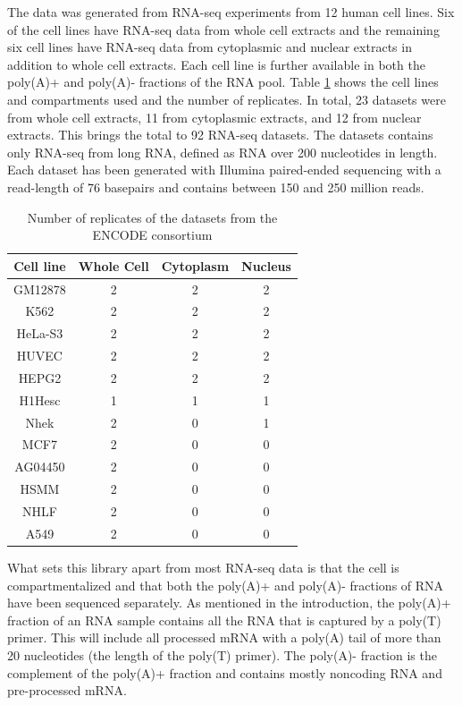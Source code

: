 The data was generated from RNA-seq experiments from 12 human cell lines. Six
of the cell lines have RNA-seq data from whole cell extracts and the remaining
six cell lines have RNA-seq data from cytoplasmic and nuclear extracts in
addition to whole cell extracts. Each cell line is further available in both
the poly(A)+ and poly(A)- fractions of the RNA pool. Table \ref{tab:Datasets}
shows the cell lines and compartments used and the number of replicates. In
total, 23 datasets were from whole cell extracts, 11 from cytoplasmic extracts,
and 12 from nuclear extracts. This brings the total to 92 RNA-seq datasets. The
datasets contains only RNA-seq from long RNA, defined as RNA over 200
nucleotides in length. Each dataset has been generated with Illumina
paired-ended sequencing with a read-length of 76 basepairs and contains between
150 and 250 million reads.

\begin{table}[hb]
	\centering
	\begin{tabular}{cccc}
	  Cell line & Whole Cell & Cytoplasm & Nucleus \\
	  \midrule
	  GM12878 & 2 & 2 & 2 \\
	  K562 & 2 & 2 & 2 \\
	  HeLa-S3 & 2 & 2 & 2 \\
	  HUVEC & 2 & 2 & 2 \\
	  HEPG2 & 2 & 2 & 2 \\
	  H1Hesc & 1 & 1 & 1 \\
	  Nhek & 2 & 0 & 1 \\
	  MCF7 & 2 & 0 & 0 \\
	  AG04450 & 2 & 0 & 0 \\
	  HSMM & 2 & 0 & 0 \\
	  NHLF & 2 & 0 & 0 \\
	  A549 & 2 & 0 & 0 \\
	\end{tabular}
	\caption{Number of replicates of the datasets from the ENCODE consortium}
	\label{tab:Datasets}
\end{table}

What sets this library apart from most RNA-seq data is that the cell is
compartmentalized and that both the poly(A)+ and poly(A)- fractions of RNA have
been sequenced separately. As mentioned in the introduction, the poly(A)+
fraction of an RNA sample contains all the RNA that is captured by a poly(T)
primer. This will include all processed mRNA with a poly(A) tail of more than
20 nucleotides (the length of the poly(T) primer). The poly(A)- fraction is the
complement of the poly(A)+ fraction and contains mostly noncoding RNA and
pre-processed mRNA.

